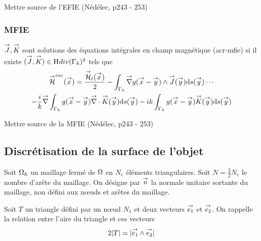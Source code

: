         \begin{REF}
          Mettre source de l'EFIE (Nédélec, p243 - 253)
        \end{REF}

      \subsubsection{MFIE}

        \begin{defn}
          \({\overset{\rightarrow}{J}},{\overset{\rightarrow}{K}}\) sont solutions des équations intégrales en champ magnétique (\gls{acr-mfie}) si il existe \(({\overset{\rightarrow}{J}},{\overset{\rightarrow}{K}}) \in \mathrm{H}_\mathrm{{}}{div}(\Gamma_h)^2\) tels que
          \begin{multline}
            \label{eq:form_int:MFIE}
            \vH^{inc}(\vx) =
            \frac{\vH_t(\vx)}{2}
              - \int_{\Gamma_h} \vgrad g(\vx - \vy) \pvect \vJ(\vy) \dd{s}(\vy) \cdots \\
            - \frac{i}{k} \vgrad \int_{\Gamma_h}  g(\vx - \vy)\vdiv\vK(\vy)\dd{s}(\vy)
              - ik \int_{\Gamma_h} g(\vx - \vy)\vK(\vy)\dd{s}(\vy)
          \end{multline}
        \end{defn}

        \begin{REF}
          Mettre source de la MFIE (Nédélec, p243 - 253)
        \end{REF}

  \subsection{Discrétisation de la surface de l'objet}

    Soit \(\Omega_h\) un maillage fermé de \(\Omega\) en \(N_e\) éléments triangulaires. Soit \(N=\frac{3}{2}N_e\) le nombre d'arête du maillage. On désigne par \({\overset{\rightarrow}{n}}\) la normale unitaire sortante du maillage, non défini aux nœuds et arêtes du maillage.

    Soit \(T\) un triangle défini par un nœud \(N_1\) et deux vecteurs \({\overset{\rightarrow}{e_1}}\) et \({\overset{\rightarrow}{e_2}}\). On rappelle la relation entre l'aire du triangle et ces vecteurs 
    \begin{equation}
      2|T| = |{\overset{\rightarrow}{e_1}}\wedge{\overset{\rightarrow}{e_2}}|
    \end{equation}

